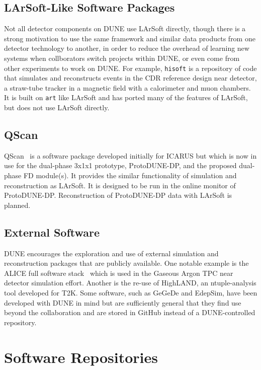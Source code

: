 \subsection{LArSoft-Like Software Packages}

Not all detector components on DUNE use LArSoft directly, though there is a strong motivation to use the
same framework and similar data products from one detector technology to another, in order to reduce the
overhead of learning new systems when collborators switch projects within DUNE, or even come from other
experiments to work on DUNE.  For example, {\tt hisoft} is a repository of code that simulates and reconstructs
events in the CDR reference design near detector, a straw-tube tracker in a magnetic field with a calorimeter
and muon chambers.  It is built on {\tt art} like LArSoft and has ported many of the features of LArSoft, but
does not use LArSoft directly.

\subsection{QScan}

QScan~\cite{LussiThesis2016}  is a software package developed initially for ICARUS but which is now in use for the
dual-phase 3x1x1 prototype, ProtoDUNE-DP, and the proposed dual-phase FD module(s).  It provides the similar
functionality of simulation and reconstruction as LArSoft.  It is designed to be run in the online monitor
of ProtoDUNE-DP.  Reconstruction of ProtoDUNE-DP data with LArSoft is planned.

\subsection{External Software}

DUNE encourages the exploration and use of external simulation and reconstruction packages that are
publicly available.  One notable example is the ALICE full software 
stack~\cite{ref:ALICEoffline,Abelev:2014ffa} which is used in the Gaseous
Argon TPC near detector simulation effort.  Another is the re-use of HighLAND, an ntuple-analysis tool
developed for T2K.  Some software, such as GeGeDe and EdepSim, have been developed with DUNE in mind
but are sufficiently general that they find use beyond the collaboration and are stored in GitHub instead
of a DUNE-controlled repository.

\section{Software Repositories}


